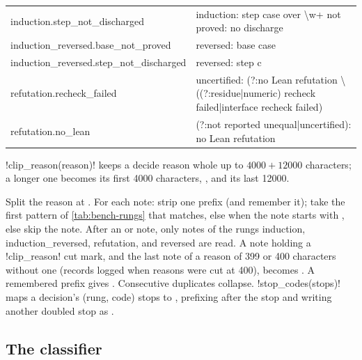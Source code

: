 {\begin{xltabular}{\textwidth}{@{}>{\ttfamily}p{0.5\textwidth} >{\ttfamily}X@{}}
induction.step\_not\_discharged & induction: step case over \textbackslash w+ not proved: no discharge\\
induction\_reversed.base\_not\_proved & reversed: base case\\
induction\_reversed.step\_not\_discharged & reversed: step c\\
refutation.recheck\_failed & uncertified: (?:no Lean refutation \textbackslash((?:residue|numeric)
  recheck failed|interface recheck failed)\\
refutation.no\_lean & (?:not reported unequal|uncertified): no Lean refutation\\
\end{xltabular}
}

\py!clip_reason(reason)! keeps a decide reason whole up to $4000+12000$ characters; a longer one
becomes its first 4000 characters, , and its last 12000.

\begin{algorithm}
Split the reason at . For each note: strip one prefix  (and
remember it); take the first pattern of \cref{tab:bench-rungs} that matches, else
 when the note starts with , else skip the note. After an
 or  note, only notes of the rungs induction,
induction\_reversed, refutation, and reversed are read. A note holding a \py!clip_reason! cut
mark, and the last note of a reason of 399 or 400 characters without one (records logged when
reasons were cut at 400), becomes . A remembered prefix gives .
Consecutive duplicates collapse. \py!stop_codes(stops)! maps a decision's (rung, code) stops to
, prefixing  after the stop  and
writing another doubled stop as .
\end{algorithm}

\subsection{The classifier}

